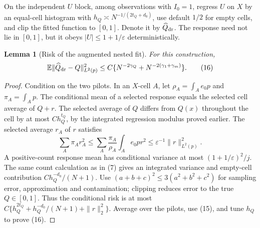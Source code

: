 \documentclass[11pt]{article}
\newtheorem{lemma}[theorem]{Lemma}
\theoremstyle{definition}
\begin{document}
On the independent $U$ block, among observations with $I_0=1$, regress
$U$ on $X$ by an equal-cell histogram with
$h_Q\asymp N^{-1/(2t_Q+d_0)}$, use default $1/2$ for empty cells,
and clip the fitted function to $[0,1]$. Denote it by $\widehat Q_{\rm dr}$.
The response need not lie in $[0,1]$, but it obeys
$|U|\le 1+1/\varepsilon$ deterministically.

\begin{lemma}[Risk of the augmented nested fit]
For this construction,
\[
 \mathbb E\|\widehat Q_{\rm dr}-Q\|_{L^2(p)}^2
 \le C\{N^{-2\gamma_Q}+N^{-2(\gamma_1+\gamma_m)}\}.
                                                        \tag{16}
\]
\end{lemma}
\begin{proof}
Condition on the two pilots. In an $X$-cell $A$, let
$\rho_A=\int_A e_0p$ and $\pi_A=\int_A p$.
The conditional mean of a selected response equals the selected
cell average of $Q+r$. The selected average of $Q$ differs from
$Q(x)$ throughout the cell by at most $C h_Q^{t_Q}$, by the integrated
regression modulus proved earlier. The selected average $r_A$ of $r$
satisfies
\[
 \sum_A\pi_A r_A^2
 \le\sum_A\frac{\pi_A}{\rho_A}\int_A e_0p r^2
 \le\varepsilon^{-1}\|r\|_{L^2(p)}^2.
\]
A positive-count response mean has conditional variance at most
$(1+1/\varepsilon)^2/j$. The same count calculation as in (7)
gives an integrated variance and empty-cell contribution
$C h_Q^{-d_0}/(N+1)$. Use $(a+b+c)^2\le3(a^2+b^2+c^2)$ for
sampling error, approximation and contamination; clipping reduces error
to the true $Q\in[0,1]$. Thus the conditional risk is at most
$C\{h_Q^{2t_Q}+h_Q^{-d_0}/(N+1)+\|r\|_2^2\}$.
Average over the pilots, use (15), and tune $h_Q$ to prove (16).
\end{proof}
\end{document}
